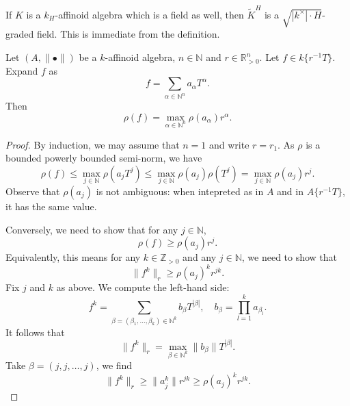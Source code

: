 \begin{example}
    If $K$ is a $k_H$-affinoid algebra which is a field as well, then $\tilde{K}^H$ is a $\sqrt{|k^{\times}|\cdot H}$-graded field. This is immediate from the definition.
\end{example}



\begin{lemma}\label{lma-rhointatering}
    Let $(A,\|\bullet\|)$ be a $k$-affinoid algebra, $n\in \mathbb{N}$ and $r\in \mathbb{R}^n_{>0}$. Let $f\in k\{r^{-1}T\}$. Expand $f$ as
    \[
        f=\sum_{\alpha\in \mathbb{N}^n}a_{\alpha}T^{\alpha}.  
    \]
    Then 
    \[
        \rho(f)=\max_{\alpha\in \mathbb{N}^n} \rho(a_{\alpha})r^{\alpha}.
    \]
\end{lemma}
\begin{proof}
    By induction, we may assume that $n=1$ and write $r=r_1$. As $\rho$ is a bounded powerly bounded semi-norm, we have
    \[
        \rho(f)\leq \max_{j\in \mathbb{N}}\rho(a_{j}T^j) \leq \max_{j\in \mathbb{N}}\rho(a_{j})\rho(T^j)= \max_{j\in \mathbb{N}} \rho(a_j)r^j.  
    \]
    Observe that $\rho(a_j)$ is not ambiguous: when intepreted as in $A$ and in $A\{r^{-1}T\}$, it has the same value.

    Conversely, we need to show that for any $j\in \mathbb{N}$, 
    \[
        \rho(f)\geq \rho(a_j)r^j.  
    \]
    Equivalently, this means for any $k\in \mathbb{Z}_{>0}$ and any $j\in \mathbb{N}$, we need to show that
    \[
        \|f^k\|_r\geq \rho(a_j)^k r^{jk}.  
    \]
    Fix $j$ and $k$ as above.
    We compute the left-hand side:
    \[
        f^k=\sum_{\beta=(\beta_1,\ldots,\beta_k)\in \mathbb{N}^k} b_{\beta} T^{|\beta|},\quad b_{\beta}=\prod_{l=1}^k a_{\beta_l}.  
    \]
    It follows that
    \[
        \|f^k\|_r=\max_{\beta \in \mathbb{N}^k} \|b_{\beta}\|T^{|\beta|}.
    \]
    Take $\beta=(j,j,\ldots,j)$, we find
    \[
        \|f^k\|_r\geq \|a_j^k\| r^{jk}\geq \rho(a_j)^k r^{jk}.
    \]
\end{proof}


